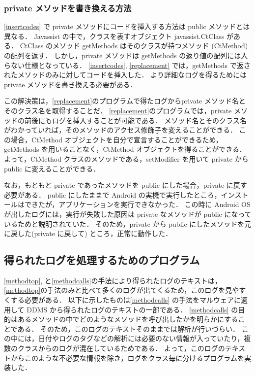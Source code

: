 \subsubsection{private メソッドを書き換える方法}
\label{private}
\ref{insertcodes} で 
private メソッドにコードを挿入する方法は public メソッドとは異なる．
Javassist の中で，クラスを表すオブジェクト javassist.CtClass がある．
CtClass のメソッド getMethods はそのクラスが持つメソッド (CtMethod) の配列を返す．
しかし，private メソッドは getMethods の返り値の配列には入らない仕様となっている．
\ref{insertcodes}, \ref{replacement} では，getMethods で返されたメソッドのみに対してコードを挿入した．
より詳細なログを得るためには private メソッドを書き換える必要がある．

この解決策は，\ref{replacement}のプログラムで得たログからprivate メソッド名とそのクラス名を取得することだ．
\ref{replacement}のプログラムでは，private メソッドの前後にもログを挿入することが可能である．
メソッド名とそのクラス名がわかっていれば，そのメソッドのアクセス修飾子を変えることができる．
この場合，CtMethod オブジェクトを自分で宣言することができるため，getMethods を用いることなく，CtMethod オブジェクトを得ることができる． 
よって，CtMethod クラスのメソッドである，setModifier を用いて private から public に変えることができる．

なお，もともと private であったメソッドを public にした場合，private に戻す必要がある．
public にしたままで Android の実機で実行したところ，インストールはできたが，アプリケーションを実行できなかった．
この時に Android OS が出したログには，実行が失敗した原因は private なメソッドが public になっているためと説明されていた．
そのため，private から public にしたメソッドを元に戻した(private に戻して) ところ，正常に動作した．

\subsection{得られたログを処理するためのプログラム}
\label{splitscript}
\ref{methodtop}, と\ref{methodcalls}の手法により得られたログのテキストは，\ref{methodtop}の手法のみと比べて多くのログが出てくるため，このログを見やすくする必要がある．
以下に示したものは\ref{methodcalls} の手法をマルウェアに適用して DDMS から得られたログのテキストの一部である．
\ref{methodcalls} の目的はあるメソッドの中でどのようなメソッドを呼び出したかを明らかにすることである．
そのため，このログのテキストそのままでは解析が行いづらい．
この中には，日付やログのタグなどの解析には必要のない情報が入っていたり，複数のクラスからのログが混在しているためである．
よって，このログのテキストからこのような不必要な情報を除き，ログをクラス毎に分けるプログラムを実装した．

